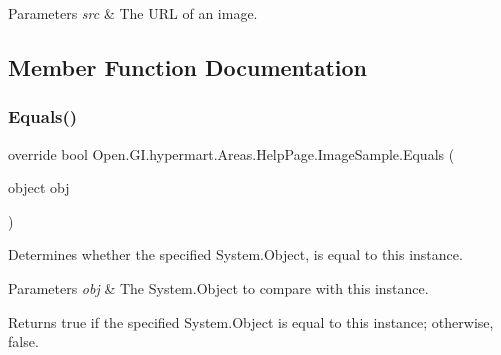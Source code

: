 \begin{DoxyParams}{Parameters}
{\em src} & The U\+RL of an image.\\
\hline
\end{DoxyParams}


\subsection{Member Function Documentation}
\hypertarget{class_open_1_1_g_i_1_1hypermart_1_1_areas_1_1_help_page_1_1_image_sample_a51e16a01c4f9a5a568c82d1f2d093337}{}\label{class_open_1_1_g_i_1_1hypermart_1_1_areas_1_1_help_page_1_1_image_sample_a51e16a01c4f9a5a568c82d1f2d093337} 
\subsubsection{\texorpdfstring{Equals()}{Equals()}}
{\footnotesize\ttfamily override bool Open.\+G\+I.\+hypermart.\+Areas.\+Help\+Page.\+Image\+Sample.\+Equals (\begin{DoxyParamCaption}\item[{object}]{obj }\end{DoxyParamCaption})}



Determines whether the specified System.\+Object, is equal to this instance. 


\begin{DoxyParams}{Parameters}
{\em obj} & The System.\+Object to compare with this instance.\\
\hline
\end{DoxyParams}
\begin{DoxyReturn}{Returns}
{\ttfamily true} if the specified System.\+Object is equal to this instance; otherwise, {\ttfamily false}. 
\end{DoxyReturn}
\hypertarget{class_open_1_1_g_i_1_1hypermart_1_1_areas_1_1_help_page_1_1_image_sample_a3374507c967e37d7fcba28ec9481865b}{}\label{class_open_1_1_g_i_1_1hypermart_1_1_areas_1_1_help_page_1_1_image_sample_a3374507c967e37d7fcba28ec9481865b} 
